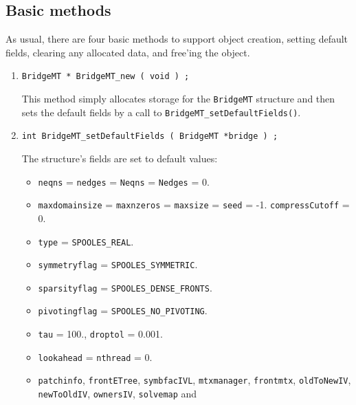 \subsection{Basic methods}
\label{subsection:BridgeMT:proto:basics}
\par
As usual, there are four basic methods to support object creation,
setting default fields, clearing any allocated data, and free'ing
the object.
\par
\begin{enumerate}
\item
\begin{verbatim}
BridgeMT * BridgeMT_new ( void ) ;
\end{verbatim}
This method simply allocates storage for the {\tt BridgeMT} structure 
and then sets the default fields by a call to 
{\tt BridgeMT\_setDefaultFields()}.
\item
\begin{verbatim}
int BridgeMT_setDefaultFields ( BridgeMT *bridge ) ;
\end{verbatim}
The structure's fields are set to default values:
\begin{itemize}
\item
\texttt{neqns} = \texttt{nedges} = \texttt{Neqns} =
\texttt{Nedges} = 0.
\item
\texttt{maxdomainsize} = \texttt{maxnzeros} 
   = \texttt{maxsize} = \texttt{seed} = -1.
\texttt{compressCutoff} = 0.
\item
\texttt{type} = \texttt{SPOOLES\_REAL}.
\item
\texttt{symmetryflag} = \texttt{SPOOLES\_SYMMETRIC}.
\item
\texttt{sparsityflag} = \texttt{SPOOLES\_DENSE\_FRONTS}.
\item
\texttt{pivotingflag} = \texttt{SPOOLES\_NO\_PIVOTING}.
\item
\texttt{tau} = 100., \texttt{droptol} = 0.001.
\item
\texttt{lookahead} = \texttt{nthread} = 0.
\item
\texttt{patchinfo},
\texttt{frontETree},
\texttt{symbfacIVL},
\texttt{mtxmanager},
\texttt{frontmtx},
\texttt{oldToNewIV},
\texttt{newToOldIV},
\texttt{ownersIV},
\texttt{solvemap} and

\end{itemize}
\end{enumerate}
